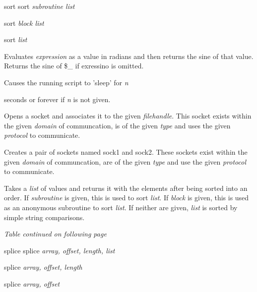 \documentclass[a4paper,11pt]{book}
\begin{document}
\noindent sort sort \textit{subroutine list}

\noindent 

\noindent sort \textit{block list}

\noindent 

\noindent sort \textit{list}

\noindent Evaluates \textit{expression }as a value in radians and then returns the sine of that value. Returns the sine of \$\_ if exressino is omitted.

\noindent 

\noindent Causes the running script to 'sleep' for \textit{n}

\noindent seconds or forever if \textit{n }is not given.

\noindent 

\noindent Opens a socket and associates it to the given \textit{filehandle}. This socket exists within the given \textit{domain }of communcation, is of the given \textit{type }and uses the given \textit{protocol }to communicate.

\noindent 

\noindent Creates a pair of sockets named sock1 and sock2. These sockets exist within the given \textit{domain }of communcation, are of the given \textit{type }and use the given \textit{protocol }to communicate.

\noindent 

\noindent Takes a \textit{list }of values and returns it with the elements after being sorted into an order. If \textit{subroutine }is given, this is used to sort \textit{list}. If \textit{block }is given, this is used as an anonymous subroutine to sort \textit{list}. If neither are given, \textit{list }is sorted by simple string comparisons.

\noindent \textit{Table continued on following page}

\noindent 

\noindent 

\noindent splice splice \textit{array, offset, length, list}

\noindent 

\noindent splice \textit{array, offset, length}

\noindent 

\noindent splice \textit{array, offset}

\noindent 

\noindent 

\noindent 

\noindent 
\end{document}
